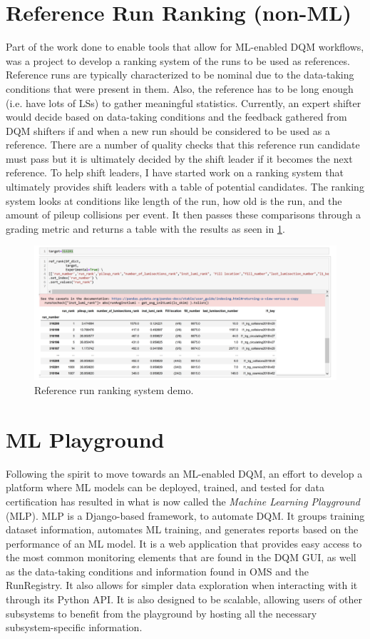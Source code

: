 \section{Reference Run Ranking (non-ML)}

Part of the work done to enable tools that allow for ML-enabled DQM workflows, was a project to develop a ranking system of the runs to be used as references. Reference runs are typically characterized to be nominal due to the data-taking conditions that were present in them. Also, the reference has to be long enough (i.e. have lots of LSs) to gather meaningful statistics. Currently, an expert shifter would decide based on data-taking conditions and the feedback gathered from DQM shifters if and when a new run should be considered to be used as a reference. There are a number of quality checks that this reference run candidate must pass but it is ultimately decided by the shift leader if it becomes the next reference. To help shift leaders, I have started work on a ranking system that ultimately provides shift leaders with a table of potential candidates. The ranking system looks at conditions like length of the run, how old is the run, and the amount of pileup collisions per event. It then passes these comparisons through a grading metric and returns a table with the results as seen in \cref{fig:ranking}.
\begin{figure}
	\centering
	\includegraphics[width=\linewidth]{Images/ranking.png}
	\caption{Reference run ranking system demo.}
	\label{fig:ranking}
\end{figure}


\section{ML Playground}
Following the spirit to move towards an ML-enabled DQM, an effort to develop a platform where ML models can be deployed, trained, and tested for data certification has resulted in what is now called the \textit{Machine Learning Playground} (MLP). MLP is a Django-based framework, to automate DQM. It groups training dataset information, automates ML training, and generates reports based on the performance of an ML model. It is a web application that provides easy access to the most common monitoring elements that are found in the DQM GUI, as well as the data-taking conditions and information found in OMS and the RunRegistry. It also allows for simpler data exploration when interacting with it through its Python API. It is also designed to be scalable, allowing users of other subsystems to benefit from the playground by hosting all the necessary subsystem-specific information.

